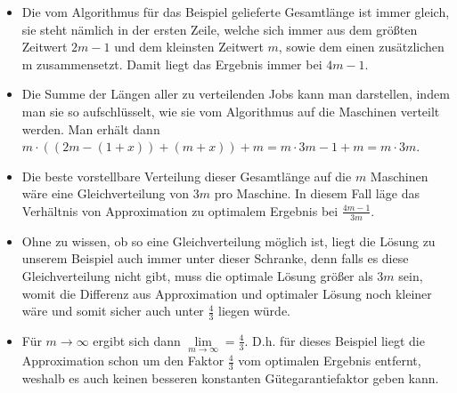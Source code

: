 \documentclass[a4paper]{article}
\begin{document}
	\begin{itemize}
		\item Die vom Algorithmus für das Beispiel gelieferte Gesamtlänge ist immer gleich, sie steht nämlich in der ersten Zeile, welche sich immer aus dem größten Zeitwert $2m-1$ und dem kleinsten Zeitwert $m$, sowie dem einen zusätzlichen m zusammensetzt. Damit liegt das Ergebnis immer bei $4m-1$.
		
		\item Die Summe der Längen aller zu verteilenden Jobs kann man darstellen, indem man sie so aufschlüsselt, wie sie vom Algorithmus auf die Maschinen verteilt werden. Man erhält dann $m \cdot ((2m-(1 + x)) + (m + x)) + m = m \cdot 3m-1 + m = m \cdot 3m$.
		
		\item Die beste vorstellbare Verteilung dieser Gesamtlänge auf die $m$ Maschinen wäre eine Gleichverteilung von $3m$ pro Maschine. In diesem Fall läge das Verhältnis von Approximation zu optimalem Ergebnis bei $\frac{4m -1}{3m}$. 
		
		\item Ohne zu wissen, ob so eine Gleichverteilung möglich ist, liegt die Lösung zu unserem Beispiel auch immer unter dieser Schranke, denn falls es diese Gleichverteilung nicht gibt, muss die optimale Lösung größer als $3m$ sein, womit die Differenz aus Approximation und optimaler Lösung noch kleiner wäre und somit sicher auch unter $\frac{4}{3}$ liegen würde.
		
		\item Für $m \rightarrow \infty$ ergibt sich dann $\lim\limits_{m \rightarrow \infty} = \frac{4}{3}$. D.h. für dieses Beispiel liegt die Approximation schon um den Faktor $\frac{4}{3}$ vom optimalen Ergebnis entfernt, weshalb es auch keinen besseren konstanten Gütegarantiefaktor geben kann.
	
	\end{itemize}
\end{document}
